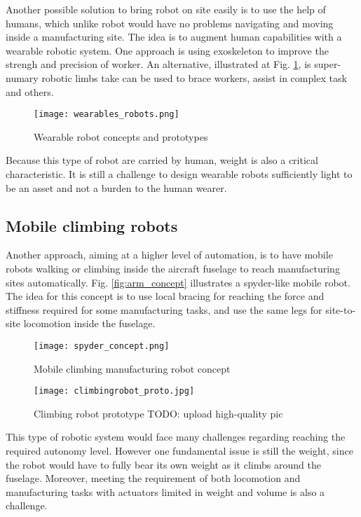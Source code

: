Another possible solution to bring robot on site easily is to use the help of humans, which unlike robot would have no problems navigating and moving inside a manufacturing site. The idea is to augment human capabilities with a wearable robotic system. One approach is using exoskeleton to improve the strengh and precision of worker. An alternative, illustrated at Fig. \ref{fig:wearable_concept}, is super-numary robotic limbs take can be used to brace workers, assist in complex task and others. 

\begin{figure}[H]
	\centering
		\texttt{[image: wearables\_robots.png]}
		\caption{Wearable robot concepts and prototypes \cite{bonilla_robot_2014} \cite{parietti_supernumerary_2016} \cite{wu_hold-and-manipulate_2015} }
	\label{fig:wearable_concept}
\end{figure}

Because this type of robot are carried by human, weight is also a critical characteristic. It is still a challenge to design wearable robots sufficiently light to be an asset and not a burden to the human wearer.


\subsection{Mobile climbing robots}
\label{sec:MobileClimbingRobots}

Another approach, aiming at a higher level of automation, is to have mobile robots walking or climbing inside the aircraft fuselage to reach manufacturing sites automatically. Fig. \ref{fig:arm_concept} illustrates a spyder-like mobile robot. The idea for this concept is to use local bracing for reaching the force and stiffness required for some manufacturing tasks, and use the same legs for site-to-site locomotion inside the fuselage. 

\begin{figure}[H]
	\centering
		\texttt{[image: spyder\_concept.png]}
		\caption{Mobile climbing manufacturing robot concept}
	\label{fig:climbingrobot}
\end{figure}

\begin{figure}[H]
	\centering
		\texttt{[image: climbingrobot\_proto.jpg]}
		\caption{Climbing robot prototype TODO: upload high-quality pic}
	\label{fig:climbingrobot_proto}
\end{figure}

This type of robotic system would face many challenges regarding reaching the required autonomy level. However one fundamental issue is still the weight, since the robot would have to fully bear its own weight as it climbs around the fuselage. Moreover, meeting the requirement of both locomotion and manufacturing tasks with actuators limited in weight and volume is also a challenge. 



